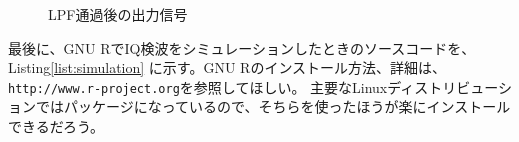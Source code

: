 \begin{figure}
\begin{minipage}{0.5\hsize}
\caption{LPF通過後の出力信号} \label{fig:output}
\end{minipage}
\end{figure}

最後に、GNU RでIQ検波をシミュレーションしたときのソースコードを、Listing\ref{list:simulation}
に示す。GNU Rのインストール方法、詳細は、\texttt{http://www.r-project.org}を参照してほしい。
主要なLinuxディストリビューションではパッケージになっているので、そちらを使ったほうが楽にインストール
できるだろう。
\lstset{language=R,basicstyle=\ttfamily,numbers=left}

